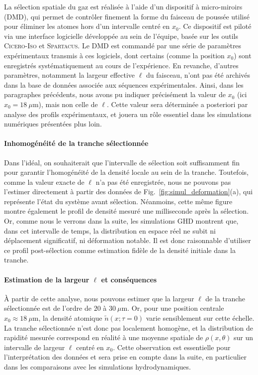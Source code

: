 La sélection spatiale du gaz est réalisée à l’aide d’un dispositif à micro-miroirs (DMD), qui permet de contrôler finement la forme du faisceau de poussée utilisé pour éliminer les atomes hors d’un intervalle centré en $x_0$. Ce dispositif est piloté via une interface logicielle développée au sein de l’équipe, basée sur les outils \textsc{Cicero-Iso} et \textsc{Spartacus}. Le DMD est commandé par une série de paramètres expérimentaux transmis à ces logiciels, dont certains (comme la position $x_0$) sont enregistrés systématiquement au cours de l’expérience. En revanche, d'autres paramètres, notamment la largeur effective $\ell$ du faisceau, n’ont pas été archivés dans la base de données associée aux séquences expérimentales. Ainsi, dans les paragraphes précédents, nous avons pu indiquer précisément la valeur de $x_0$ (ici $x_0 = 18~\mu\mathrm{m}$), mais non celle de $\ell$. Cette valeur sera déterminée a posteriori par analyse des profils expérimentaux, et jouera un rôle essentiel dans les simulations numériques présentées plus loin.

\medskip
\paragraph{Inhomogénéité de la tranche sélectionnée}

Dans l'idéal, on souhaiterait que l’intervalle de sélection soit suffisamment fin pour garantir l’homogénéité de la densité locale au sein de la tranche. Toutefois, comme la valeur exacte de $\ell$ n’a pas été enregistrée, nous ne pouvons pas l’estimer directement à partir des données de Fig.~\ref{fig:simul_deformation}(a), qui représente l’état du système avant sélection. Néanmoins, cette même figure montre également le profil de densité mesuré une milliseconde après la sélection. Or, comme nous le verrons dans la suite, les simulations GHD montrent que, dans cet intervalle de temps, la distribution en espace réel ne subit ni déplacement significatif, ni déformation notable. Il est donc raisonnable d’utiliser ce profil post-sélection comme estimation fidèle de la densité initiale dans la tranche.

\medskip
\paragraph{Estimation de la largeur $\ell$ et conséquences}

À partir de cette analyse, nous pouvons estimer que la largeur $\ell$ de la tranche sélectionnée est de l’ordre de $20$ à $30~\mu\mathrm{m}$. Or, pour une position centrale $x_0 \approx 18~\mu\mathrm{m}$, la densité atomique $\tilde{n}(x ; \tau = 0 )$ varie sensiblement sur cette échelle. La tranche sélectionnée n’est donc pas localement homogène, et la distribution de rapidité mesurée correspond en réalité à une moyenne spatiale de $\rho(x,\theta)$ sur un intervalle de largeur $\ell$ centré en $x_0$. Cette observation est essentielle pour l’interprétation des données et sera prise en compte dans la suite, en particulier dans les comparaisons avec les simulations hydrodynamiques.



